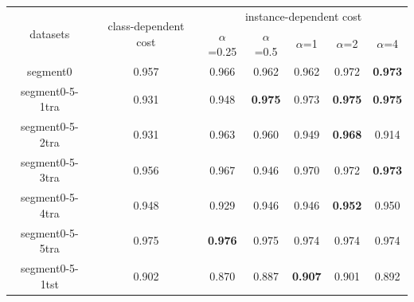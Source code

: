 \documentclass{article}
\begin{document}
\begin{table}[!ht]
	\centering
\begin{tabular}{|c||c|ccccc|}
	\hline
	\multirow{2}{*}{datasets} & \multirow{2}{*}{class-dependent cost} & \multicolumn{5}{c|}{instance-dependent cost}                                                                                                                           \\ \cline{3-7} 
	&                                       & \multicolumn{1}{c|}{$\alpha$=0.25}         & \multicolumn{1}{c|}{$\alpha$=0.5}          & \multicolumn{1}{c|}{$\alpha$=1}            & \multicolumn{1}{c|}{$\alpha$=2}            & $\alpha$=4            \\ \hline \hline
segment0                  & 0.957                                 & \multicolumn{1}{c|}{0.966}          & \multicolumn{1}{c|}{0.962}          & \multicolumn{1}{c|}{0.962}          & \multicolumn{1}{c|}{0.972}          & \textbf{0.973} \\ \hline
segment0-5-1tra           & 0.931                                 & \multicolumn{1}{c|}{0.948}          & \multicolumn{1}{c|}{\textbf{0.975}} & \multicolumn{1}{c|}{0.973}          & \multicolumn{1}{c|}{\textbf{0.975}} & \textbf{0.975} \\ \hline
segment0-5-2tra           & 0.931                                 & \multicolumn{1}{c|}{0.963}          & \multicolumn{1}{c|}{0.960}          & \multicolumn{1}{c|}{0.949}          & \multicolumn{1}{c|}{\textbf{0.968}} & 0.914          \\ \hline
segment0-5-3tra           & 0.956                                 & \multicolumn{1}{c|}{0.967}          & \multicolumn{1}{c|}{0.946}          & \multicolumn{1}{c|}{0.970}          & \multicolumn{1}{c|}{0.972}          & \textbf{0.973} \\ \hline
segment0-5-4tra           & 0.948                                 & \multicolumn{1}{c|}{0.929}          & \multicolumn{1}{c|}{0.946}          & \multicolumn{1}{c|}{0.946}          & \multicolumn{1}{c|}{\textbf{0.952}} & 0.950          \\ \hline
segment0-5-5tra           & 0.975                                 & \multicolumn{1}{c|}{\textbf{0.976}} & \multicolumn{1}{c|}{0.975}          & \multicolumn{1}{c|}{0.974}          & \multicolumn{1}{c|}{0.974}          & 0.974          \\ \hline
segment0-5-1tst           & 0.902                                 & \multicolumn{1}{c|}{0.870}          & \multicolumn{1}{c|}{0.887}          & \multicolumn{1}{c|}{\textbf{0.907}} & \multicolumn{1}{c|}{0.901}          & 0.892          \\ \hline

\end{tabular}
\end{table}
\end{document}
